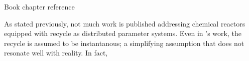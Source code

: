 Book chapter reference \autocite{krstic2009book}

As stated previously, not much work is published addressing chemical reactors equipped with recycle as distributed parameter systems. Even in 's work, the recycle is assumed to be instantanous; a simplifying assumption that does not resonate well with reality. In fact, %


